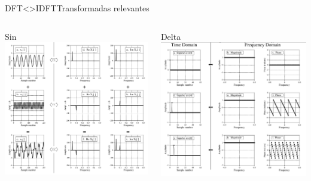 \begin{frame}{DFT<>IDFT}{Transformadas relevantes}
   \begin{columns}[c]
      \begin{column}{.33\textwidth}
         Sin
         \centering\includegraphics[width=1.0\textwidth]{3_clase/equivalencias_seno}
      \end{column}
      \begin{column}{.33\textwidth}
         Delta
         \centering\includegraphics[width=1.0\textwidth]{3_clase/equivalencias_delta}

\end{column}
\end{columns}
\end{frame}
